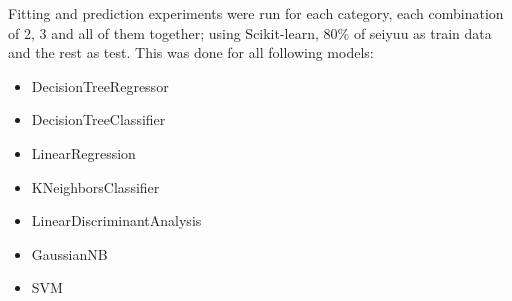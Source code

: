 \begin{frame}
Fitting and prediction experiments were run for each category, each combination of 2, 3 and all of them together; using Scikit-learn, 80\% of seiyuu as train data and the rest as test. This was done for all following models:
\begin{itemize}
	\item DecisionTreeRegressor
	\item DecisionTreeClassifier
	\item LinearRegression
	\item KNeighborsClassifier
	\item LinearDiscriminantAnalysis
	\item GaussianNB
	\item SVM
\end{itemize}
\end{frame}


